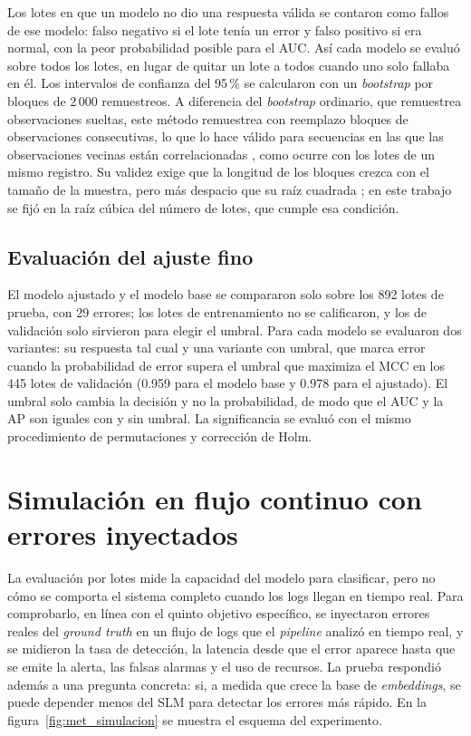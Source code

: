 Los lotes en que un modelo no dio una respuesta válida se contaron como fallos de ese modelo: falso negativo si el lote tenía un error y falso positivo si era normal, con la peor probabilidad posible para el AUC. Así cada modelo se evaluó sobre todos los lotes, en lugar de quitar un lote a todos cuando uno solo fallaba en él. Los intervalos de confianza del 95\,\% se calcularon con un \textit{bootstrap} por bloques de 2\,000 remuestreos. A diferencia del \textit{bootstrap} ordinario, que remuestrea observaciones sueltas, este método remuestrea con reemplazo bloques de observaciones consecutivas, lo que lo hace válido para secuencias en las que las observaciones vecinas están correlacionadas \cite{buhlmann1994_blockwise}, como ocurre con los lotes de un mismo registro. Su validez exige que la longitud de los bloques crezca con el tamaño de la muestra, pero más despacio que su raíz cuadrada \cite{buhlmann1994_blockwise}; en este trabajo se fijó en la raíz cúbica del número de lotes, que cumple esa condición.

\subsection{Evaluación del ajuste fino}

El modelo ajustado y el modelo base se compararon solo sobre los 892 lotes de prueba, con 29 errores; los lotes de entrenamiento no se calificaron, y los de validación solo sirvieron para elegir el umbral. Para cada modelo se evaluaron dos variantes: su respuesta tal cual y una variante con umbral, que marca error cuando la probabilidad de error supera el umbral que maximiza el MCC en los 445 lotes de validación (0.959 para el modelo base y 0.978 para el ajustado). El umbral solo cambia la decisión y no la probabilidad, de modo que el AUC y la AP son iguales con y sin umbral. La significancia se evaluó con el mismo procedimiento de permutaciones y corrección de Holm.

\section{Simulación en flujo continuo con errores inyectados}\label{sec:met_simulacion}\label{sec:met_inyeccion}

La evaluación por lotes mide la capacidad del modelo para clasificar, pero no cómo se comporta el sistema completo cuando los logs llegan en tiempo real. Para comprobarlo, en línea con el quinto objetivo específico, se inyectaron errores reales del \textit{ground truth} en un flujo de logs que el \textit{pipeline} analizó en tiempo real, y se midieron la tasa de detección, la latencia desde que el error aparece hasta que se emite la alerta, las falsas alarmas y el uso de recursos. La prueba respondió además a una pregunta concreta: si, a medida que crece la base de \textit{embeddings}, se puede depender menos del SLM para detectar los errores más rápido. En la figura~\ref{fig:met_simulacion} se muestra el esquema del experimento.

